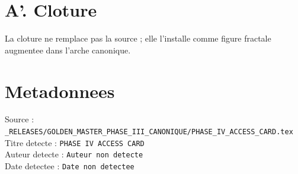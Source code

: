 \documentclass[11pt,a4paper]{article}
\begin{document}
\section*{A'. Cloture}
La cloture ne remplace pas la source ; elle l'installe comme figure fractale augmentee dans l'arche canonique.

\section*{Metadonnees}
Source : \verb|_RELEASES/GOLDEN_MASTER_PHASE_III_CANONIQUE/PHASE_IV_ACCESS_CARD.tex|\\
Titre detecte : \texttt{PHASE IV ACCESS CARD}\\
Auteur detecte : \texttt{Auteur non detecte}\\
Date detectee : \texttt{Date non detectee}
\end{document}
